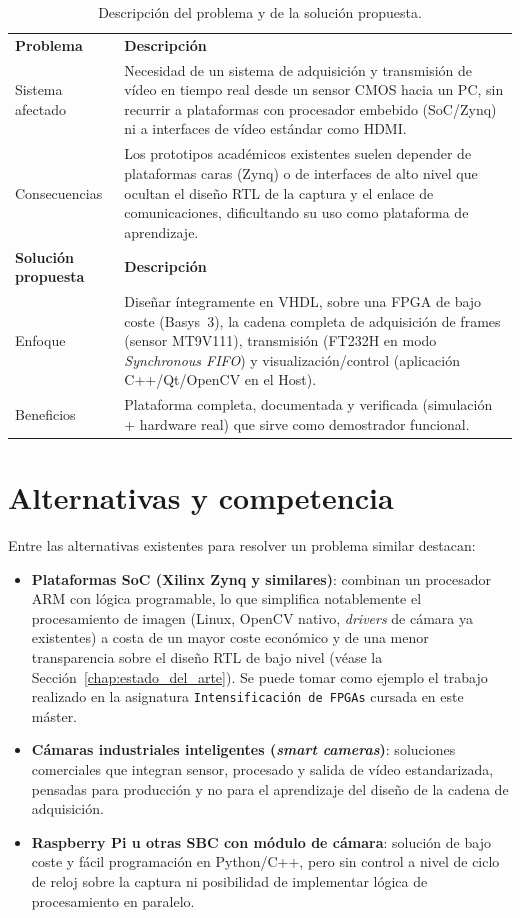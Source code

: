 \documentclass[../main.tex]{subfiles}
\begin{document}
\begin{table}[H]
\centering
\caption{Descripción del problema y de la solución propuesta.}
\label{tab:problema_solucion}
\begin{tabular}{>{\raggedright\arraybackslash}p{3cm}>{\raggedright\arraybackslash}p{10cm}}
\rowcolor[HTML]{156082}
{\color{white}\textbf{Problema}} & {\color{white}\textbf{Descripción}} \\
\rowcolor[HTML]{C0E6F5}
Sistema afectado & Necesidad de un sistema de adquisición y transmisión de vídeo en tiempo real desde un sensor CMOS hacia un PC, sin recurrir a plataformas con procesador embebido (SoC/Zynq) ni a interfaces de vídeo estándar como HDMI. \\
Consecuencias & Los prototipos académicos existentes suelen depender de plataformas caras (Zynq) o de interfaces de alto nivel que ocultan el diseño RTL de la captura y el enlace de comunicaciones, dificultando su uso como plataforma de aprendizaje. \\
\rowcolor[HTML]{156082}
{\color{white}\textbf{Solución propuesta}} & {\color{white}\textbf{Descripción}} \\
\rowcolor[HTML]{C0E6F5}
Enfoque & Diseñar íntegramente en \ac{VHDL}, sobre una FPGA de bajo coste (Basys~3), la cadena completa de adquisición de frames (sensor MT9V111), transmisión (FT232H en modo \textit{Synchronous FIFO}) y visualización/control (aplicación C++/Qt/OpenCV en el Host). \\
Beneficios & Plataforma completa, documentada y verificada (simulación + hardware real) que sirve como demostrador funcional. \\
\end{tabular}
\end{table}

\section{Alternativas y competencia}
Entre las alternativas existentes para resolver un problema similar destacan:
\begin{itemize}
    \item \textbf{Plataformas SoC (Xilinx Zynq y similares)}: combinan un procesador ARM con lógica programable, lo que simplifica notablemente el procesamiento de imagen (Linux, OpenCV nativo, \textit{drivers} de cámara ya existentes) a costa de un mayor coste económico y de una menor transparencia sobre el diseño RTL de bajo nivel (véase la Sección~\ref{chap:estado_del_arte}). Se puede tomar como ejemplo el trabajo realizado en la asignatura  \texttt{Intensificación de FPGAs} cursada en este máster.
    \item \textbf{Cámaras industriales inteligentes (\textit{smart cameras})}: soluciones comerciales que integran sensor, procesado y salida de vídeo estandarizada, pensadas para producción y no para el aprendizaje del diseño de la cadena de adquisición.
    \item \textbf{Raspberry Pi u otras \ac{SBC} con módulo de cámara}: solución de bajo coste y fácil programación en Python/C++, pero sin control a nivel de ciclo de reloj sobre la captura ni posibilidad de implementar lógica de procesamiento en paralelo.
\end{itemize}
\end{document}
